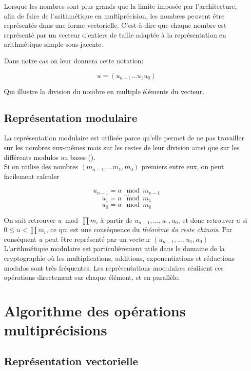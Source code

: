 \documentclass[letterpaper]{article}
\begin{document}
Lorsque les nombres sont plus grands que la limite imposée par l'architecture,
afin de faire de l'arithmétique en multiprécision, les nombres peuvent être
représentés dans une forme vectorielle. C'est-à-dire que chaque nombre est
représenté par un vecteur d'entiers de taille adaptée à la représentation
en arithmétique simple sous-jacente.

Dans notre cas on leur donnera cette notation:

  $$u = (u_{n-1} \dots u_1 u_0)$$

Qui illustre la division du nombre en multiple éléments du vecteur.

\subsection{Représentation modulaire}

La représentation modulaire est utilisée parce qu'elle permet de ne pas
travailler sur les nombres eux-mêmes mais sur les restes de leur division
ainsi que sur les différents modulos ou bases (\cite{wikiamodulaire}).\\

Si on utilise des nombres $(m_{n - 1}, \dots m_1, m_0)$ premiers entre eux,
on peut facilement calculer

  $$u_{n - 1} = u \mod m_{n - 1}$$
  $$\dots$$
  $$u_1 = u \mod m_1$$
  $$u_0 = u \mod m_0$$

On sait retrouver $u \bmod \prod m_i$ à partir de $u_{n - 1}, \dots, u_1, u_0$,
et donc retrouver $u$ si $0 ≤ u < \prod m_i$,  ce qui est une conséquence du
\emph{théorème du reste chinois}. Par conséquent $u$ peut être représenté par
un vecteur $(u_{n - 1}, \dots, u_{1}, u_{0})$\\

L'arithmétique modulaire est particulièrement utile dans le domaine de la
cryptographie où les multiplications, additions, exponentiations et réductions
modulos sont très fréquentes. Les représentations modulaires réalisent ces
opérations directement sur chaque élément, et en parallèle.

\section{Algorithme des opérations multiprécisions}

\subsection{Représentation vectorielle}
\end{document}
